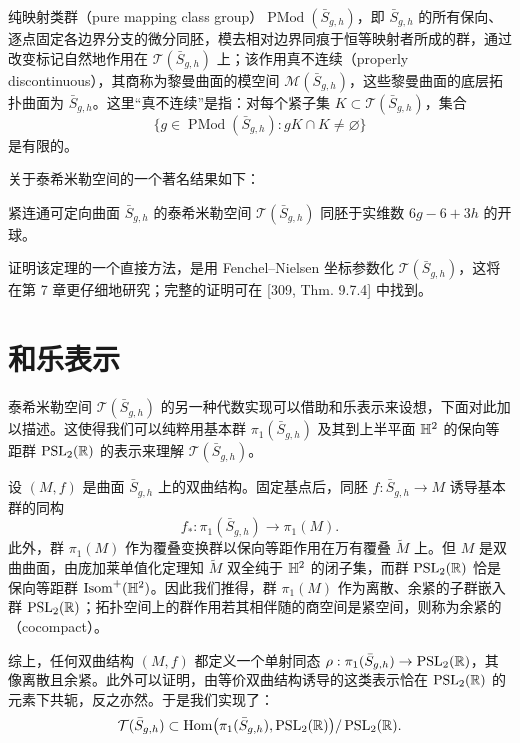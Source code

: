 纯映射类群（pure mapping class group）$\operatorname{PMod}(\bar S_{g,h})$，即 $\bar S_{g,h}$ 的所有保向、逐点固定各边界分支的微分同胚，模去相对边界同痕于恒等映射者所成的群，通过改变标记自然地作用在 $\mathcal{T}(\bar S_{g,h})$ 上；该作用真不连续（properly discontinuous），其商称为黎曼曲面的模空间 $\mathcal{M}(\bar S_{g,h})$，这些黎曼曲面的底层拓扑曲面为 $\bar S_{g,h}$。这里“真不连续”是指：对每个紧子集 $K\subset\mathcal{T}(\bar S_{g,h})$，集合
\[
\{g\in\operatorname{PMod}(\bar S_{g,h}) : gK\cap K\neq\varnothing\}
\]
是有限的。

关于泰希米勒空间的一个著名结果如下：

\begin{theorem}[6.6] 紧连通可定向曲面 $\bar S_{g,h}$ 的泰希米勒空间 $\mathcal{T}(\bar S_{g,h})$ 同胚于实维数 $6g-6+3h$ 的开球。\end{theorem}

证明该定理的一个直接方法，是用 Fenchel–Nielsen 坐标参数化 $\mathcal{T}(\bar S_{g,h})$，这将在第 7 章更仔细地研究；完整的证明可在 [309, Thm. 9.7.4] 中找到。


\section{和乐表示}

泰希米勒空间 $\mathcal{T}(\bar S_{g,h})$ 的另一种代数实现可以借助和乐表示来设想，下面对此加以描述。这使得我们可以纯粹用基本群 $\pi_1(\bar S_{g,h})$ 及其到上半平面 $\mathbb{H}^2$ 的保向等距群 $\operatorname{PSL}_2(\mathbb{R})$ 的表示来理解 $\mathcal{T}(\bar S_{g,h})$。

设 $(M,f)$ 是曲面 $\bar S_{g,h}$ 上的双曲结构。固定基点后，同胚 $f:\bar S_{g,h}\to M$ 诱导基本群的同构
\[
f_*:\pi_1(\bar S_{g,h})\to\pi_1(M).
\]
此外，群 $\pi_1(M)$ 作为覆叠变换群以保向等距作用在万有覆叠 $\tilde M$ 上。但 $M$ 是双曲曲面，由庞加莱单值化定理知 $\tilde M$ 双全纯于 $\mathbb{H}^2$ 的闭子集，而群 $\operatorname{PSL}_2(\mathbb{R})$ 恰是保向等距群 $\operatorname{Isom}^+(\mathbb{H}^2)$。因此我们推得，群 $\pi_1(M)$ 作为离散、余紧的子群嵌入群 $\operatorname{PSL}_2(\mathbb{R})$；拓扑空间上的群作用若其相伴随的商空间是紧空间，则称为余紧的（cocompact）。

综上，任何双曲结构 $(M,f)$ 都定义一个单射同态 $\rho:\pi_1(\bar S_{g,h})\to\operatorname{PSL}_2(\mathbb{R})$，其像离散且余紧。此外可以证明，由等价双曲结构诱导的这类表示恰在 $\operatorname{PSL}_2(\mathbb{R})$ 的元素下共轭，反之亦然。于是我们实现了：
\[
\mathcal{T}(\bar S_{g,h})\subset\operatorname{Hom}\bigl(\pi_1(\bar S_{g,h}),\operatorname{PSL}_2(\mathbb{R})\bigr)/\operatorname{PSL}_2(\mathbb{R}).
\]

